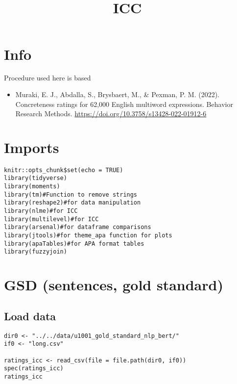 \documentclass[a4paper,10pt,onecolumn,oneside,openright]{article}
\date{}
\title{ICC}
\begin{document}
\maketitle


\section{Info}
\label{sec:org2c2eb7d}
Procedure used here is based \textcite{MurakiEtAl2022pub}
\begin{itemize}
\item Muraki, E. J., Abdalla, S., Brysbaert, M., \& Pexman, P. M. (2022).
Concreteness ratings for 62,000 English multiword expressions. Behavior
Research Methods. \url{https://doi.org/10.3758/s13428-022-01912-6}
\end{itemize}
\section{Imports}
\label{sec:org867fdf6}
\begin{verbatim}
knitr::opts_chunk$set(echo = TRUE)
library(tidyverse)
library(moments)
library(tm)#Function to remove strings
library(reshape2)#for data manipulation
library(nlme)#for ICC
library(multilevel)#for ICC
library(arsenal)#for dataframe comparisons
library(jtools)#for theme_apa function for plots
library(apaTables)#for APA format tables
library(fuzzyjoin)

\end{verbatim}

\section{GSD (sentences, gold standard)}
\label{sec:org7e2ee1e}
\subsection{Load data}
\label{sec:org254e466}
\begin{verbatim}
dir0 <- "../../data/u1001_gold_standard_nlp_bert/"
if0 <- "long.csv"

ratings_icc <- read_csv(file = file.path(dir0, if0))
spec(ratings_icc)
ratings_icc
\end{verbatim}
\end{document}
